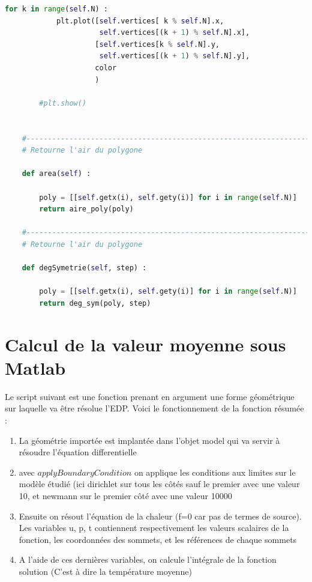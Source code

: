 \documentclass[a4paper,reqno]{article}
\begin{document}
\begin{lstlisting}[language=Python,frame=single,caption=Création de la classe Polygon]
        for k in range(self.N) :
            plt.plot([self.vertices[ k % self.N].x,
                      self.vertices[(k + 1) % self.N].x],
                     [self.vertices[k % self.N].y,
                      self.vertices[(k + 1) % self.N].y],
                     color
                     )

        #plt.show()


    #---------------------------------------------------------------------
    # Retourne l'air du polygone

    def area(self) :

        poly = [[self.getx(i), self.gety(i)] for i in range(self.N)]
        return aire_poly(poly)

    #---------------------------------------------------------------------
    # Retourne l'air du polygone

    def degSymetrie(self, step) :

        poly = [[self.getx(i), self.gety(i)] for i in range(self.N)]
        return deg_sym(poly, step)


\end{lstlisting}


\section*{Calcul de la valeur moyenne sous Matlab}

Le script suivant est une fonction prenant en argument une forme géométrique sur laquelle va être résolue l'EDP. Voici le fonctionnement de la fonction résumée :

\begin{enumerate}
\item La géométrie importée est implantée dans l'objet model qui va servir à résoudre l'équation differentielle
\item avec $applyBoundaryCondition$ on applique les conditions aux limites sur le modèle étudié (ici dirichlet sur tous les côtés sauf le premier avec une valeur 10, et newmann sur le premier côté avec une valeur 10000
\item Ensuite on résout l'équation de la chaleur (f=0 car pas de termes de source). Les variables u, p, t contiennent respectivement les valeurs scalaires de la fonction, les coordonnées des sommets, et les références de chaque sommets
\item A l'aide de ces dernières variables, on calcule l'intégrale de la fonction solution (C'est à dire la température moyenne)
\end{enumerate}
\end{document}
